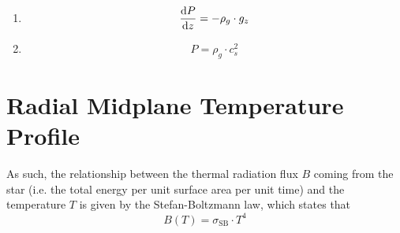 \begin{enumerate}
        \item {}
            \begin{equation}
                \deriv{P}{z} = - \rho_g \cdot g_z  %
            \end{equation}
    
        \item {}
            \begin{equation}
                P = \rho_g \cdot c_s^2
            \end{equation}
    
    \end{enumerate}
    
    
    





\clearpage\section{Radial Midplane Temperature Profile}

     As such, the relationship between the
    thermal radiation flux $B$ coming from the star (i.e. the total energy per unit surface area 
    per unit time) and the temperature $T$ is given by the Stefan-Boltzmann law, which states that
    \begin{equation}
        \label{eq:stefan_boltzmann_law}
        B(T) = \sigma_\text{SB}\cdot T^4   %
    \end{equation}

